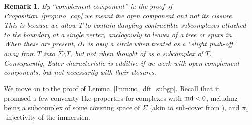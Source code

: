\documentclass{amsart}
\newtheorem{remark}[conjecture]{Remark}
\newcommand{\md}{\textnormal{md}}
\newcommand{\whS}{{\widehat{\Sigma}}}
\begin{document}
\begin{remark}
By ``complement component'' in the proof of Proposition~\ref{prop:no_cap} we meant the open component and not its closure. This is because we allow $T$ to contain dangling contractible subcomplexes attached to the boundary at a single vertex, analogously to leaves of a tree or spurs in \cite[Definition 2.4]{sectional_curvature_cpct_cores_local_quasiconvexity_Wise04}. When these are present, $\partial T$ is only a circle when treated as a ``slight push-off'' away from $T$ into $\whS\setminus T$, but not when thought of as a subcomplex of $T$. Consequently, Euler characteristic is additive if we work with open complement components, but not necessarily with their closures.
\end{remark}

We move on to the proof of Lemma~\ref{lmm:no_dft_subgp}. Recall that it promised a few convexity-like properties for complexes with $\md<0$, including being a subcomplex of some covering space of $\Sigma$ (akin to sub-cover from \cite[Definition 2.1]{local_stats_random_perms_free_prods_PuderZimhoni24}), and $\pi_1$-injectivity of the immersion.
\end{document}
